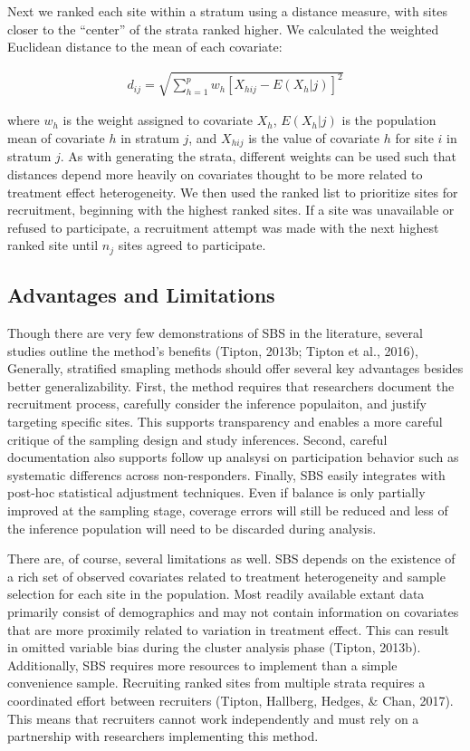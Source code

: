 \documentclass[man,floatsintext]{apa6}
\begin{document}
Next we ranked each site within a stratum using a distance measure, with sites closer to the \enquote{center} of the strata ranked higher. We calculated the weighted Euclidean distance to the mean of each covariate:

\begin{align} \label{eq:euclid}
  d_{ij} = \sqrt{\sum^p_{h=1}w_h[X_{hij} - E(X_h|j)]^2}
\end{align}

where \(w_h\) is the weight assigned to covariate \(X_h\), \(E(X_h|j)\) is the population mean of covariate \(h\) in stratum \(j\), and \(X_{hij}\) is the value of covariate \(h\) for site \(i\) in stratum \(j\). As with generating the strata, different weights can be used such that distances depend more heavily on covariates thought to be more related to treatment effect heterogeneity. We then used the ranked list to prioritize sites for recruitment, beginning with the highest ranked sites. If a site was unavailable or refused to participate, a recruitment attempt was made with the next highest ranked site until \(n_j\) sites agreed to participate.

\hypertarget{advantages-and-limitations}{%
\subsection{Advantages and Limitations}\label{advantages-and-limitations}}

Though there are very few demonstrations of SBS in the literature, several studies outline the method's benefits (Tipton, 2013b; Tipton et al., 2016), Generally, stratified smapling methods should offer several key advantages besides better generalizability. First, the method requires that researchers document the recruitment process, carefully consider the inference populaiton, and justify targeting specific sites. This supports transparency and enables a more careful critique of the sampling design and study inferences. Second, careful documentation also supports follow up analsysi on participation behavior such as systematic differencs across non-responders. Finally, SBS easily integrates with post-hoc statistical adjustment techniques. Even if balance is only partially improved at the sampling stage, coverage errors will still be reduced and less of the inference population will need to be discarded during analysis.

There are, of course, several limitations as well. SBS depends on the existence of a rich set of observed covariates related to treatment heterogeneity and sample selection for each site in the population. Most readily available extant data primarily consist of demographics and may not contain information on covariates that are more proximily related to variation in treatment effect. This can result in omitted variable bias during the cluster analysis phase (Tipton, 2013b). Additionally, SBS requires more resources to implement than a simple convenience sample. Recruiting ranked sites from multiple strata requires a coordinated effort between recruiters (Tipton, Hallberg, Hedges, \& Chan, 2017). This means that recruiters cannot work independently and must rely on a partnership with researchers implementing this method.
\end{document}
